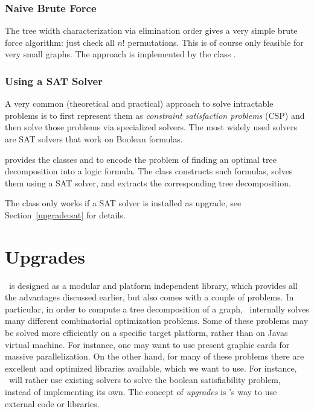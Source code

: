 \documentclass[a4paper, ukenglish, twoside, openright]{jdrasilmanual}
\begin{document}
\section{Naive Brute Force}
The tree width characterization via elimination order gives a very
simple brute force algorithm: just check all $n!$ permutations. This
is of course only feasible for very small graphs. The approach is
implemented by the class .

\section{Using a SAT Solver}
A very common (theoretical and practical) approach to solve intractable
problems is to first represent them as \emph{constraint satisfaction
  problems} (CSP) and then solve those problems via specialized solvers. The
most widely used solvers are SAT solvers that work on Boolean
formulas.

\Jdrasil{} provides the classes  and
 to encode the problem of finding an optimal
tree decomposition into a logic formula. The class
 constructs such formulas, solves them using a
SAT solver, and extracts the corresponding tree decomposition.

The class  only works if a SAT solver is
installed as upgrade, see Section~\ref{upgrade:sat} for details.

\part{Upgrades}\label{part:upgrades}

\Jdrasil\ is designed as a modular and platform independent library,
which provides all the advantages discussed earlier, but also comes
with a couple of problems. In particular, in order to compute a tree
decomposition of a graph, \Jdrasil\ internally solves many different
combinatorial optimization problems. Some of these problems may be
solved more efficiently on a specific target platform, rather than on
Javas virtual machine. For instance, one may want to use present
graphic cards for massive parallelization. On the other hand, for many
of these problems there are excellent and optimized libraries
available, which we want to use. For instance, \Jdrasil\ will rather
use existing  solvers to solve the boolean satisfiability
problem, instead of implementing its own. The concept of
\emph{upgrades} is \Jdrasil's way to use external code or
libraries. 
\end{document}
